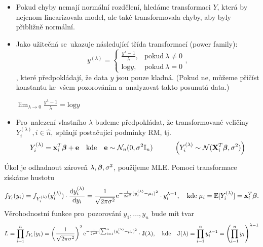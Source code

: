 \begin{itemize}
\item Pokud chyby nemají normální rozdělení, hledáme transformaci $Y$, která by nejenom linearizovala model, ale také transformovala chyby, aby byly přibližně normální.
\item Jako užitečná se~ukazuje následující třída transformací (power family):
 $$
 y^{(\lambda)} = \begin{cases}
      \frac{y^{\lambda}-1}{\lambda}, & \text{pokud}\ \lambda \neq 0 \\
      \text{log}y, & \text{pokud}\ \lambda = 0
    \end{cases},
 $$
, které předpokládají, že data $y$ jsou pouze kladná. (Pokud ne, můžeme přičíst konstantu ke~všem pozorováním a~analyzovat takto posunutá data.)
\begin{remark}
 $\lim_{\lambda \rightarrow 0}  \frac{y^{\lambda}-1}{\lambda} = \text{log}y$
\end{remark}
\item Pro~nalezení vlastního $\lambda$ budeme předpokládat, že transformované veličiny \\ $Y_i^{(\lambda)}, i\in\widehat{n},$ splňují postačující podmínky RM, tj.
 $$
 Y_i^{(\lambda)} = \textbf{x}_i^T \boldsymbol{\beta} + \textbf{e} \quad \text{kde} \quad \textbf{e} \sim \mathcal{N}_n (0,\sigma^2 \mathbb{I}_{n}) \quad \quad \quad \left(Y_i^{(\lambda)} \sim \mathcal{N} (\textbf{X}_i^T \boldsymbol{\beta}, \sigma^2) \right)
 $$
\end{itemize}
Úkol je odhadnout zároveň $\lambda, \boldsymbol{\beta}, \sigma^2$, použijeme MLE. Pomocí transformace získáme hustotu
 $$
  f_{Y_i}(y_i) = f_{Y_i^{(\lambda)}}(y_i^{(\lambda)}) \cdot \frac{\mathrm{d} y_i^{(\lambda)}}{\mathrm{d} y_i} = \frac{1}{\sqrt{2 \pi \sigma^2}} \mathrm{e}^{-\frac{1}{2 \sigma^2}(y_i^{(\lambda)} - \mu_i)^2} \cdot y_i^{\lambda - 1}, \quad \text{kde} \; \mu_i = \mathbb{E}[Y_i^{(\lambda)}] = \textbf{x}_i^T \boldsymbol{\beta}.
 $$
Věrohodnostní funkce pro~pozorování $y_1,...,y_n$ bude mít tvar
 $$
  L = \prod_{i = 1}^nf_{Y_i}(y_i) = \left(\frac{1}{\sqrt{2 \pi \sigma^2}} \right)^2 \mathrm{e}^{-\frac{1}{2 \sigma^2}(\sum_{i = 1}^n (y_i^{(\lambda)} - \mu_i)^2} \cdot \mathrm{J}(\lambda), \quad \text{kde} \quad \mathrm{J}(\lambda) = \prod_{i = 1}^n y_i^{\lambda - 1} = \left(\prod_{i = 1}^n y_i \right)^{\lambda - 1}
 $$

